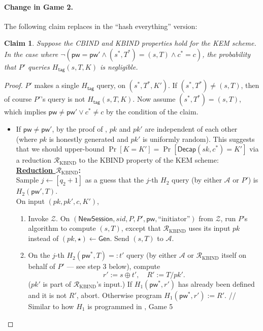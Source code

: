\documentclass{article}
\theoremstyle{plain}
\newtheorem{claim}{Claim}
\theoremstyle{definition}
\theoremstyle{remark}
\newcommand{\adv}{\mathcal{A}}
\newcommand{\env}{\mathcal{Z}}
\newcommand{\red}{\mathcal{R}}
\newcommand{\Gen}{\mathsf{Gen}}
\newcommand{\Decap}{\mathsf{Decap}}
\newcommand{\Htag}{H_\mathsf{tag}}
\newcommand{\pw}{\mathsf{pw}}
\newcommand{\NewSession}{\mathsf{NewSession}}
\begin{document}
\paragraph{Change in Game 2.}
The following claim replaces  in the ``hash everything'' version:
\begin{claim}
\label{clm:htag4}
Suppose the CBIND and KBIND properties hold for the KEM scheme. In the case where $\neg(\pw = \pw' \land (s^*,T^*) = (s,T) \land c^* = c)$, the probability that $P'$ queries $\Htag(s,T,K)$ is negligible.
\end{claim}
\begin{proof}
$P'$ makes a single $\Htag$ query, on $(s^*,T^*,K')$. If $(s^*,T^*) \neq (s,T)$, then of course $P'$'s query is not $\Htag(s,T,K)$. Now assume $(s^*,T^*) = (s,T)$, which implies $\pw \neq \pw' \lor c^* \neq c$ by the condition of the claim.
\begin{itemize}
  \item If $\pw \neq \pw'$, by the proof of , $pk$ and $pk'$ are independent of each other (where $pk$ is honestly generated and $pk'$ is uniformly random). This suggests that we should upper-bound $\Pr[K = K'] = \Pr[\Decap(sk,c^*) = K']$ via a reduction $\red_\text{KBIND}$ to the KBIND property of the KEM scheme:
      \vspace{-6pt} \\ %
      \textbf{\underline{Reduction $\red_\mathrm{KBIND}$}:}
      \vspace{6pt} \\
      Sample $j \gets [q_2+1]$ as a guess that the $j$-th $H_2$ query (by either $\adv$ or $P'$) is $H_2(\pw',T)$. \\
      On input $(pk,pk',c,K')$,
      \begin{enumerate}
        \item Invoke $\env$. On $(\NewSession, sid, P, P', \pw, \text{``initiator''})$ from $\env$, run $P$'s algorithm to compute $(s,T)$, except that $\red_\mathrm{KBIND}$ uses its input $pk$ instead of $(pk,\star) \gets \Gen$. Send $(s,T)$ to $\adv$.
        \item On the $j$-th $H_2(\pw^*,T) =: t'$ query (by either $\adv$ or $\red_\mathrm{KBIND}$ itself on behalf of $P'$ --- see step 3 below), compute
            \[
            r' := s \oplus t', \quad R' := T/pk'.
            \]
            ($pk'$ is part of $\red_\mathrm{KBIND}$'s input.) If $H_1(\pw^*,r')$ has already been defined and it is not $R'$, abort. Otherwise program $H_1(\pw^*,r') := R'$. \quad \textcolor[gray]{0.5}{// Similar to how $H_1$ is programmed in , Game 5}

\end{enumerate}
\end{itemize}
\end{proof}
\end{document}
